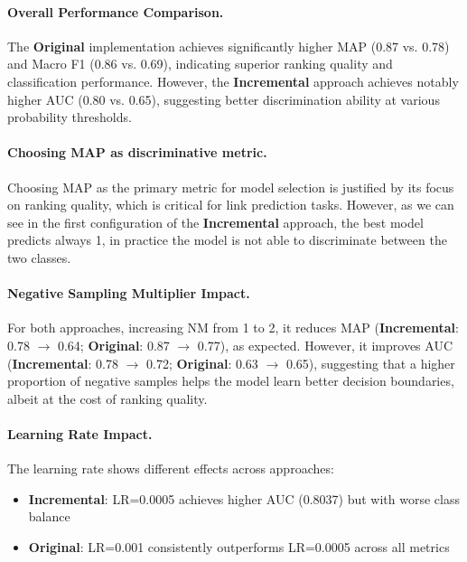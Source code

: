 \paragraph{Overall Performance Comparison.} The \textcolor{drawred}{\textbf{Original}} implementation achieves significantly higher MAP (0.87 vs. 0.78) and Macro F1 (0.86 vs. 0.69), indicating superior ranking quality and classification performance. However, the \textcolor{drawblue}{\textbf{Incremental}} approach achieves notably higher AUC (0.80 vs. 0.65), suggesting better discrimination ability at various probability thresholds.

\paragraph{Choosing MAP as discriminative metric.} Choosing MAP as the primary metric for model selection is justified by its focus on ranking quality, which is critical for link prediction tasks. However, as we can see in the first configuration of the \textcolor{drawblue}{\textbf{Incremental}} approach, the best model predicts always 1, in practice the model is not able to discriminate between the two classes.

\paragraph{Negative Sampling Multiplier Impact.} For both approaches, increasing NM from 1 to 2, it reduces MAP (\textcolor{drawblue}{\textbf{Incremental}}: 0.78 $\rightarrow$ 0.64; \textcolor{drawred}{\textbf{Original}}: 0.87 $\rightarrow$ 0.77), as expected. However, it improves AUC (\textcolor{drawblue}{\textbf{Incremental}}: 0.78 $\rightarrow$ 0.72; \textcolor{drawred}{\textbf{Original}}: 0.63 $\rightarrow$ 0.65), suggesting that a higher proportion of negative samples helps the model learn better decision boundaries, albeit at the cost of ranking quality.

\paragraph{Learning Rate Impact.} The learning rate shows different effects across approaches:
\begin{itemize}
	\item \textcolor{drawblue}{\textbf{Incremental}}: LR=0.0005 achieves higher AUC (0.8037) but with worse class balance
	\item \textcolor{drawred}{\textbf{Original}}: LR=0.001 consistently outperforms LR=0.0005 across all metrics
\end{itemize}

